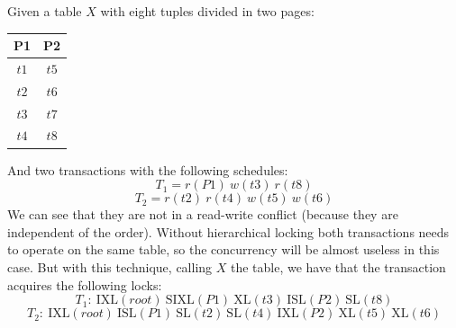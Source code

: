 \begin{itemize}
\begin{table}[H]
\begin{tabular}{ccccccc}
        \end{tabular}
    \end{table}
    \begin{example}
        Given a table $X$ with eight tuples divided in two pages: 
        \begin{table}[H]
            \centering
            \begin{tabular}{cc}
            \textbf{P1}                 & \textbf{P2}               \\ \hline
            \multicolumn{1}{|c|}{$t1$}  & \multicolumn{1}{c|}{$t5$} \\ 
            \multicolumn{1}{|c|}{$t2$}  & \multicolumn{1}{c|}{$t6$} \\ 
            \multicolumn{1}{|c|}{$t3$}  & \multicolumn{1}{c|}{$t7$} \\ 
            \multicolumn{1}{|c|}{$t4$}  & \multicolumn{1}{c|}{$t8$} \\ \hline
            \end{tabular}
        \end{table}
        And two transactions with the following schedules: 
        \[T_1=r(P1)\:w(t3)\:r(t8)\]
        \[T_2=r(t2)\:r(t4)\:w(t5)\:w(t6)\]
        We can see that they are not in a read-write conflict (because they are independent of the order). 
        Without hierarchical locking both transactions needs to operate on the same table, so the concurrency will be almost useless in this case. 
        But with this technique, calling $X$ the table, we have that the transaction acquires the following locks: 
        \[T_1:\:\text{IXL}(root)\:\text{SIXL}(P1)\:\text{XL}(t3)\:\text{ISL}(P2)\:\text{SL}(t8)\]
        \[T_2:\:\text{IXL}(root)\:\text{ISL}(P1)\:\text{SL}(t2)\:\text{SL}(t4)\:\text{IXL}(P2)\:\text{XL}(t5)\:\text{XL}(t6)\]
    \end{example}
\end{itemize}